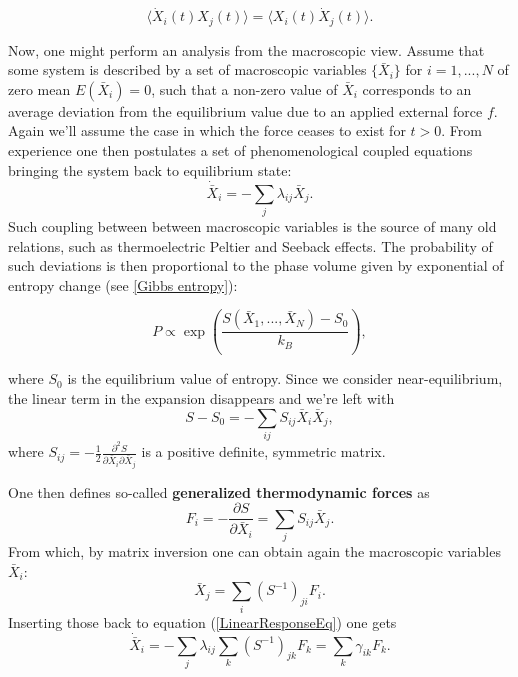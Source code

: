 \documentclass[a4paper,12pt]{article}
\begin{document}
\begin{equation}
\label{CorrelationTimeDerivative}
  \langle \dot{X}_i(t) X_j(t) \rangle = \langle X_i(t) \dot{X}_j(t) \rangle.
\end{equation}

Now, one might perform an analysis from the macroscopic view.
Assume that some system is described by a set of macroscopic variables $\{\bar{X}_i\}$ for $i=1,...,N$ of zero mean $E(\bar{X}_i)=0$, such that a non-zero value of $\bar{X}_i$ corresponds to an average deviation from the equilibrium value due to an applied external force $f$. Again we'll assume the case in which the force ceases to exist for $t>0$. From experience one then postulates a set of phenomenological coupled equations bringing the system back to equilibrium state: 
\begin{equation}
\label{LinearResponseEq}
  \dot{\bar{X}}_i=-\sum_j \lambda_{ij} \bar{X}_j.
\end{equation}
Such coupling between between macroscopic variables is the source of many old relations, such as thermoelectric Peltier and Seeback effects. The probability of such deviations is then proportional to the phase volume given by exponential of entropy change (see \ref{Gibbs entropy}):

\begin{equation}
  P \propto \exp(\frac{S(\bar{X}_1,...,\bar{X}_N)-S_0}{k_B}),
\end{equation}

where $S_0$ is the equilibrium value of entropy. Since we consider near-equilibrium, the linear term in the expansion disappears and we're left with
\begin{equation}
  S-S_0 = - \sum_{ij} S_{ij}\bar{X}_i \bar{X}_j,
\end{equation}
where $S_{ij}= -\frac{1}{2}\frac{\partial^2{S}}{\partial{\bar{X}_i}\partial{\bar{X}_j}}$ is a positive definite, symmetric matrix. %

One then defines so-called \textbf{generalized thermodynamic forces} as
\begin{equation}
  F_i= -\frac{\partial{S}}{\partial{\bar{X}_i}}= \sum_j S_{ij}\bar{X}_j.
\end{equation}
From which, by matrix inversion one can obtain again the macroscopic variables $\bar{X}_i$:
\begin{equation}
  \bar{X}_j = \sum_i (S^{-1})_{ji} F_i.
\end{equation}
Inserting those back to equation (\ref{LinearResponseEq}) one gets
\begin{equation}
\label{FluxesOnMacroscopic}
  \dot{\bar{X}}_i=-\sum_j \lambda_{ij} \sum_k (S^{-1})_{jk} F_k = \sum_k \gamma_{ik} F_k.
\end{equation}
\end{document}
